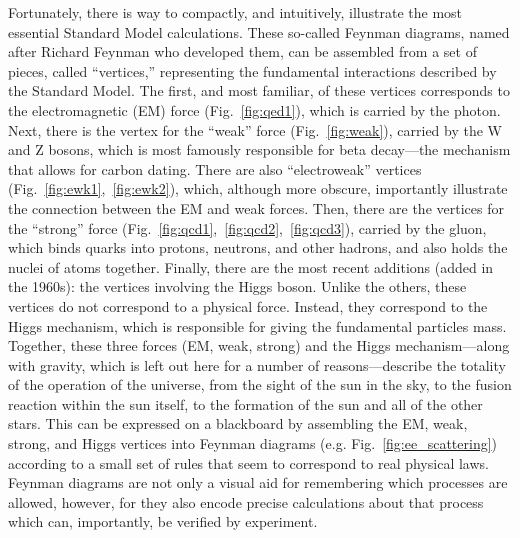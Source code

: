 Fortunately, there is way to compactly, and intuitively, illustrate the most essential Standard Model calculations. 
These so-called Feynman diagrams, named after Richard Feynman who developed them, can be assembled from a set of pieces, called ``vertices,'' representing the fundamental interactions described by the Standard Model. 
The first, and most familiar, of these vertices corresponds to the electromagnetic (EM) force (Fig.~\ref{fig:qed1}), which is carried by the photon. 
Next, there is the vertex for the ``weak'' force (Fig.~\ref{fig:weak}), carried by the W and Z bosons, which is most famously responsible for beta decay---the mechanism that allows for carbon dating. 
There are also ``electroweak'' vertices (Fig.~\ref{fig:ewk1},~\ref{fig:ewk2}), which, although more obscure, importantly illustrate the connection between the EM and weak forces. 
Then, there are the vertices for the ``strong'' force (Fig.~\ref{fig:qcd1},~\ref{fig:qcd2},~\ref{fig:qcd3}), carried by the gluon, which binds quarks into protons, neutrons, and other hadrons, and also holds the nuclei of atoms together. 
Finally, there are the most recent additions (added in the 1960s): the vertices involving the Higgs boson. 
Unlike the others, these vertices do not correspond to a physical force. 
Instead, they correspond to the Higgs mechanism, which is responsible for giving the fundamental particles mass. 
Together, these three forces (EM, weak, strong) and the Higgs mechanism---along with gravity, which is left out here for a number of reasons---describe the totality of the operation of the universe, from the sight of the sun in the sky, to the fusion reaction within the sun itself, to the formation of the sun and all of the other stars. 
This can be expressed on a blackboard by assembling the EM, weak, strong, and Higgs vertices into Feynman diagrams (e.g. Fig.~\ref{fig:ee_scattering}) according to a small set of rules that seem to correspond to real physical laws. 
Feynman diagrams are not only a visual aid for remembering which processes are allowed, however, for they also encode precise calculations about that process which can, importantly, be verified by experiment.

